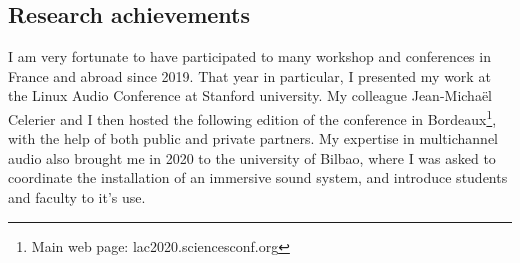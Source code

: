 \documentclass[journal,onecolumn]{IEEEtran}
\begin{document}
\subsection{Research achievements} %
I am very fortunate to have participated to many workshop and conferences in France and abroad since 2019. That year in particular, I presented my work at the Linux Audio Conference at Stanford university. My colleague Jean-Michaël Celerier and I then hosted the following edition of the conference in Bordeaux\footnote{Main web page: lac2020.sciencesconf.org}, with the help of both public and private partners. 
My expertise in multichannel audio also brought me in 2020 to the university of Bilbao, where I was asked to coordinate the installation of an immersive sound system, and introduce students and faculty to it's use.
\end{document}
